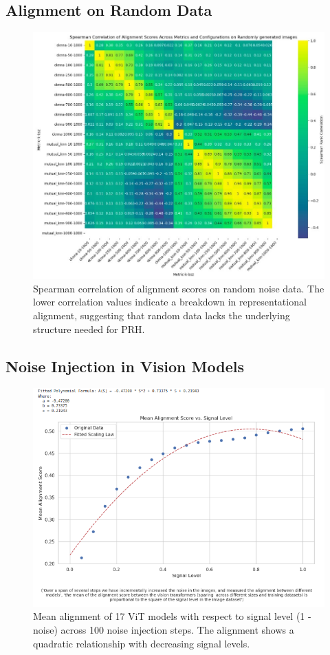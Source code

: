 \documentclass[10pt,a4paper]{article}
\begin{document}
\subsection{Alignment on Random Data}
\begin{figure}[H]
    \centering
    \includegraphics[width=\textwidth]{prh_correlation_random.jpg}
    \caption{Spearman correlation of alignment scores on random noise data. The lower correlation values indicate a breakdown in representational alignment, suggesting that random data lacks the underlying structure needed for PRH.}
    \label{fig:prh_correlation_random}
\end{figure}

\subsection{Noise Injection in Vision Models}
\begin{figure}[H]
    \centering
    \includegraphics[width=\textwidth]{alignment_vs_signal_level.png}
    \caption{Mean alignment of 17 ViT models with respect to signal level (1 - noise) across 100 noise injection steps. The alignment shows a quadratic relationship with decreasing signal levels.}
    \label{fig:alignment_vs_signal_level}
\end{figure}
\end{document}
